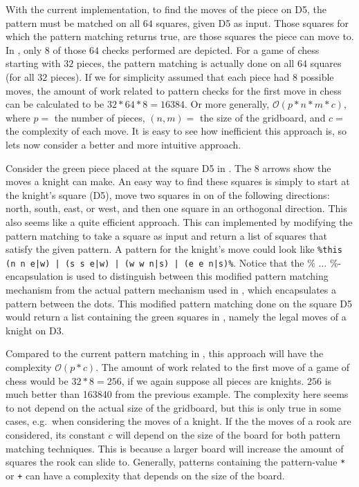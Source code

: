 With the current implementation, to find the moves of the piece on D5,
the pattern must be matched on all $64$ squares, given D5 as input.
Those squares for which the pattern matching returns true, are those
squares the piece can move to. In , only
$8$ of those $64$ checks performed are depicted. For a game of chess
starting with $32$ pieces, the pattern matching is actually done on all
$64$ squares (for all $32$ pieces). If we for simplicity assumed
that each piece had $8$ possible moves, the amount of work related to
pattern checks for the first move in chess can be calculated to be $32
* 64 * 8 = \num{16384}$. Or more generally, $\mathcal{O}(p * n * m *
c)$, where $p = $ the number of pieces, $(n, m) = $ the size of the
gridboard, and $c = $ the complexity of each move. It is easy to see how
inefficient this approach is, so lets now consider a better and more
intuitive approach.

Consider the green piece placed at the square D5 in
. The $8$ arrows show the moves a knight can make.
An easy way to find these squares is simply to start at the knight's square
(D5), move two squares in on of the following directions: north, south, east, or
west, and then one square in an orthogonal direction. This also seems like a
quite efficient approach. This can implemented by modifying the pattern matching
to take a square as input and return a list of squares that satisfy the given
pattern. A pattern for the knight's move could look like \texttt{\%this (n n
e|w) | (s s e|w) | (w w n|s) | (e e n|s)\%}. Notice that the \% $\ldots$
\%-encapsulation is used to distinguish between this modified pattern matching
mechanism from the actual pattern mechanism used in \productname{}, which
encapsulates a pattern between the dots. This modified pattern matching done on
the square D5 would return a list containing the green squares in
, namely the legal moves of a knight on D3.

Compared to the current pattern matching in \productname{}, this approach will
have the complexity $\mathcal{O}(p * c)$. The amount of work related to the
first move of a game of chess would be $32 * 8 = 256$, if we again suppose all
pieces are knights. $256$ is much better than \num{163840} from the previous
example. The complexity here seems to not depend on the actual size of the
gridboard, but this is only true in some cases, e.g.\ when considering the moves
of a knight. If the the moves of a rook are considered, its constant $c$ will
depend on the size of the board for both pattern matching techniques. This is
because a larger board will increase the amount of squares the rook can slide
to. Generally, patterns containing the pattern-value \texttt{*} or \texttt{+}
can have a complexity that depends on the size of the board.

